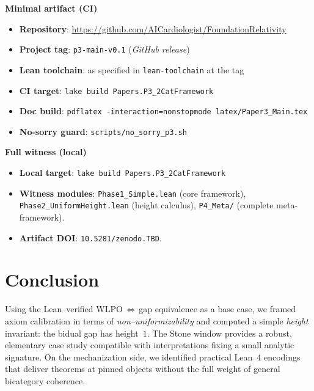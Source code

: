 \documentclass[11pt]{article}
\theoremstyle{definition}
\theoremstyle{remark}
\providecommand{\leanRepo}{\url{https://github.com/AICardiologist/FoundationRelativity}}
\providecommand{\pThreeTag}{p3-main-v0.1} %
\providecommand{\pThreeDOI}{10.5281/zenodo.TBD}  %
\begin{document}
\begin{mdframed}[backgroundcolor=gray!10]
\textbf{Minimal artifact (CI)}
\begin{itemize}
  \item \textbf{Repository}: \leanRepo
  \item \textbf{Project tag}: \texttt{\pThreeTag} (\emph{GitHub release})
  \item \textbf{Lean toolchain}: as specified in \texttt{lean-toolchain} at the tag
  \item \textbf{CI target}: \texttt{lake build Papers.P3\_2CatFramework}
  \item \textbf{Doc build}: \texttt{pdflatex -interaction=nonstopmode latex/Paper3\_Main.tex}
  \item \textbf{No-sorry guard}: \texttt{scripts/no\_sorry\_p3.sh}
\end{itemize}

\textbf{Full witness (local)}
\begin{itemize}
  \item \textbf{Local target}: \texttt{lake build Papers.P3\_2CatFramework}
  \item \textbf{Witness modules}: 
    \texttt{Phase1\_Simple.lean} (core framework),
    \texttt{Phase2\_UniformHeight.lean} (height calculus),
    \texttt{P4\_Meta/} (complete meta-framework).
  \item \textbf{Artifact DOI}: \texttt{\pThreeDOI}.
\end{itemize}
\end{mdframed}

\section{Conclusion}

Using the Lean–verified WLPO\,$\Leftrightarrow$\,gap equivalence as a base case, we framed axiom calibration in terms of \emph{non--uniformizability} and computed a simple \emph{height} invariant: the bidual gap has height~$1$. The Stone window provides a robust, elementary case study compatible with interpretations fixing a small analytic signature. On the mechanization side, we identified practical Lean~4 encodings that deliver theorems at pinned objects without the full weight of general bicategory coherence. 

\bigskip
\end{document}
